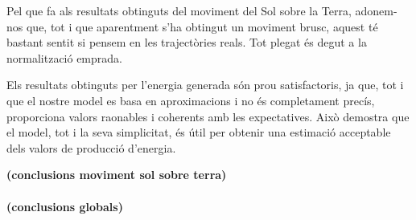 \documentclass[10pt, twoside, a4paper]{article}
\begin{document}
Pel que fa als resultats obtinguts del moviment del Sol sobre la Terra, adonem-nos que, tot i que aparentment s'ha obtingut un moviment brusc, aquest té bastant sentit si pensem en les trajectòries reals. Tot plegat és degut a la normalització emprada.

Els resultats obtinguts per l'energia generada són prou satisfactoris, ja que, tot i que el nostre model es basa en aproximacions i no és completament precís, proporciona valors raonables i coherents amb les expectatives. Això demostra que el model, tot i la seva simplicitat, és útil per obtenir una estimació acceptable dels valors de producció d'energia.


\textbf{(conclusions moviment sol sobre terra)}
\\
\\
\textbf{(conclusions globals)}
\end{document}
